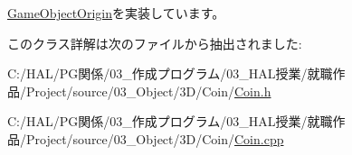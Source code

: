 \mbox{\hyperlink{class_game_object_origin_aeac8fc4a1f625982313a9a60dd35d016}{Game\+Object\+Origin}}を実装しています。



このクラス詳解は次のファイルから抽出されました\+:\begin{DoxyCompactItemize}
\item 
C\+:/\+H\+A\+L/\+P\+G関係/03\+\_\+作成プログラム/03\+\_\+\+H\+A\+L授業/就職作品/\+Project/source/03\+\_\+\+Object/3\+D/\+Coin/\mbox{\hyperlink{_coin_8h}{Coin.\+h}}\item 
C\+:/\+H\+A\+L/\+P\+G関係/03\+\_\+作成プログラム/03\+\_\+\+H\+A\+L授業/就職作品/\+Project/source/03\+\_\+\+Object/3\+D/\+Coin/\mbox{\hyperlink{_coin_8cpp}{Coin.\+cpp}}\end{DoxyCompactItemize}
